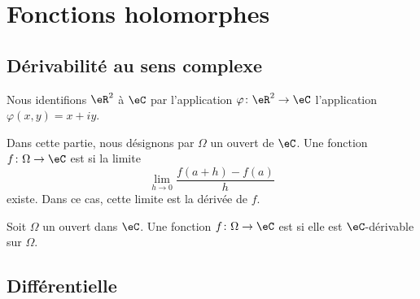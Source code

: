 
\section{Fonctions holomorphes}

\subsection{Dérivabilité au sens complexe}

Nous identifions \( \eR^2\) à \( \eC\) par l'application \( \varphi\colon \eR^2\to \eC\) l'application \( \varphi(x,y)=x+iy\).

Dans cette partie, nous désignons par \( \Omega\) un ouvert de \( \eC\). Une fonction \( f\colon \Omega\to \eC\) est  si la limite
\begin{equation}
    \lim_{h\to 0} \frac{ f(a+h)-f(a) }{ h }
\end{equation}
existe. Dans ce cas, cette limite est la dérivée de \( f\).

\begin{definition}  \label{DefMMpjJZ}
    Soit \( \Omega\) un ouvert dans \( \eC\). Une fonction \( f\colon \Omega\to \eC\) est  si elle est \( \eC\)-dérivable sur \( \Omega\). 
\end{definition}

\subsection{Différentielle}

